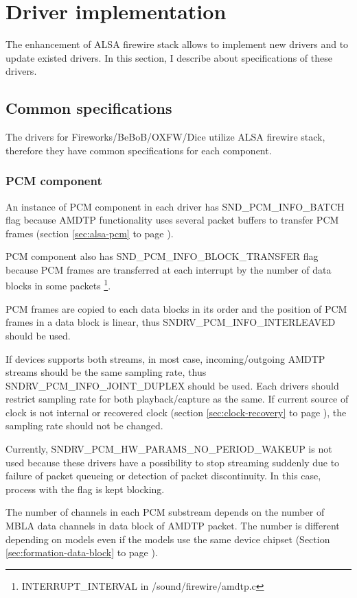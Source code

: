 \documentclass[onecolumn]{article}
\begin{document}
\section{Driver implementation}

The enhancement of ALSA firewire stack allows to implement new drivers and to update existed drivers. In this section, I describe about specifications of these drivers.

\subsection{Common specifications}

The drivers for Fireworks/BeBoB/OXFW/Dice utilize ALSA firewire stack, therefore they have common specifications for each component.

\subsubsection{PCM component}

An instance of PCM component in each driver has SND\_PCM\_INFO\_BATCH flag because AMDTP functionality uses several packet buffers to transfer PCM frames (section \ref{sec:alsa-pcm} to page \pageref{sec:alsa-pcm}).

PCM component also has SND\_PCM\_INFO\_BLOCK\_TRANSFER flag because PCM frames are transferred at each interrupt by the number of data blocks in some packets \footnote{INTERRUPT\_INTERVAL in /sound/firewire/amdtp.c}.

PCM frames are copied to each data blocks in its order and the position of PCM frames in a data block is linear, thus SNDRV\_PCM\_INFO\_INTERLEAVED should be used.

If devices supports both streams, in most case, incoming/outgoing AMDTP streams should be the same sampling rate, thus SNDRV\_PCM\_INFO\_JOINT\_DUPLEX should be used. Each drivers should restrict sampling rate for both playback/capture as the same. If current source of clock is not internal or recovered clock (section \ref{sec:clock-recovery} to page \pageref{sec:clock-recovery}), the sampling rate should not be changed.

Currently, SNDRV\_PCM\_HW\_PARAMS\_NO\_PERIOD\_WAKEUP is not used because these drivers have a possibility to stop streaming suddenly due to failure of packet queueing or detection of packet discontinuity. In this case, process with the flag is kept blocking.

The number of channels in each PCM substream depends on the number of MBLA data channels in data block of AMDTP packet. The number is different depending on models even if the models use the same device chipset (Section \ref{sec:formation-data-block} to page \pageref{sec:formation-data-block}).
\end{document}
